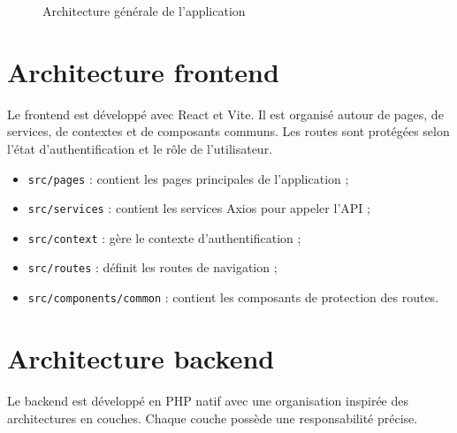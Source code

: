 \documentclass[12pt,a4paper]{report}
\begin{document}
\begin{figure}[H]
    \centering
    \caption{Architecture générale de l'application}
    \label{fig:architecture-generale}
\end{figure}

\section{Architecture frontend}

Le frontend est développé avec React et Vite. Il est organisé autour de pages, de services, de contextes et de composants communs. Les routes sont protégées selon l'état d'authentification et le rôle de l'utilisateur.

\begin{itemize}[label=--]
    \item \texttt{src/pages} : contient les pages principales de l'application ;
    \item \texttt{src/services} : contient les services Axios pour appeler l'API ;
    \item \texttt{src/context} : gère le contexte d'authentification ;
    \item \texttt{src/routes} : définit les routes de navigation ;
    \item \texttt{src/components/common} : contient les composants de protection des routes.
\end{itemize}

\section{Architecture backend}

Le backend est développé en PHP natif avec une organisation inspirée des architectures en couches. Chaque couche possède une responsabilité précise.
\end{document}
